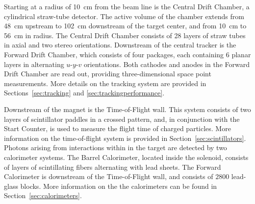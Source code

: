 


Starting at a radius of 10~cm from the beam line is the Central Drift Chamber, a cylindrical straw-tube detector. The active volume of the chamber extends from 48~cm upstream to 102~cm downstream of the target center, and from 10~cm to 56~cm in radius. The Central Drift Chamber consists of 28 layers of straw tubes in axial and two stereo orientations. Downstream of the central tracker is the Forward Drift Chamber, which consists of four packages, each containing 6 planar layers in alternating $u$-$y$-$v$ orientations. Both cathodes and anodes in the Forward Drift Chamber are read out, providing three-dimensional space point measurements. More details on the tracking system are provided in Sections~\ref{sec:tracking} and \ref{sec:trackingperformance}. 

Downstream of the magnet is the Time-of-Flight wall. This system consists of two layers of scintillator paddles in a crossed pattern, and, in conjunction with the Start Counter, is used to measure the flight time of charged particles. More information on the time-of-flight system is provided in Section~\ref{sec:scintillators}. 
Photons arising from interactions within in the \gx{} target are detected by two calorimeter systems. The Barrel Calorimeter, located inside the solenoid, consists of layers of scintillating fibers alternating with lead sheets. The Forward Calorimeter is downstream of the Time-of-Flight wall, and consists of $2800$ lead-glass blocks. More information on the the calorimeters can be found in Section~\ref{sec:calorimeters}.

